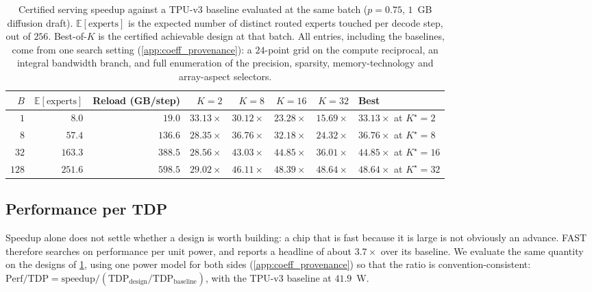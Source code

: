 \begin{table}[h]
\centering
\footnotesize
\caption{Certified serving speedup against a TPU-v3 baseline evaluated at the
same batch ($p = 0.75$, $1$~GB diffusion draft). $\mathbb{E}[\text{experts}]$ is
the expected number of distinct routed experts touched per decode step, out of
$256$. Best-of-$K$ is the certified achievable design at that batch. All
entries, including the baselines, come from one search setting
(\cref{app:coeff_provenance}): a $24$-point grid on the compute reciprocal, an
integral bandwidth branch, and full enumeration of the precision, sparsity,
memory-technology and array-aspect selectors.}
\label{tab:batch}
\begin{tabular}{@{}rrrrrrrl@{}}
\toprule
$B$ & $\mathbb{E}[\text{experts}]$ & Reload (GB/step) & $K{=}2$ & $K{=}8$ &
$K{=}16$ & $K{=}32$ & Best \\
\midrule
$1$   & $8.0$   & $19.0$  & $\mathbf{33.13}\times$ & $30.12\times$ & $23.28\times$ & $15.69\times$ & $33.13\times$ at $K^\star{=}2$ \\
$8$   & $57.4$  & $136.6$ & $28.35\times$ & $\mathbf{36.76}\times$ & $32.18\times$ & $24.32\times$ & $36.76\times$ at $K^\star{=}8$ \\
$32$  & $163.3$ & $388.5$ & $28.56\times$ & $43.03\times$ & $\mathbf{44.85}\times$ & $36.01\times$ & $44.85\times$ at $K^\star{=}16$ \\
$128$ & $251.6$ & $598.5$ & $29.02\times$ & $46.11\times$ & $48.39\times$ & $\mathbf{48.64}\times$ & $48.64\times$ at $K^\star{=}32$ \\
\bottomrule
\end{tabular}
\end{table}

\subsection{Performance per TDP}
\label{sec:perf_tdp}

Speedup alone does not settle whether a design is worth building: a chip that is
fast because it is large is not obviously an advance. FAST~\citep{zhang_fast}
therefore searches on performance per unit power, and reports a headline of
about $3.7\times$ over its baseline. We evaluate the same quantity on the
designs of \cref{tab:batch}, using one power model for both sides
(\cref{app:coeff_provenance}) so that the ratio is convention-consistent:
$\mathrm{Perf/TDP} = \text{speedup} / (\mathrm{TDP}_{\text{design}} /
\mathrm{TDP}_{\text{baseline}})$, with the TPU-v3 baseline at $41.9$~W.

